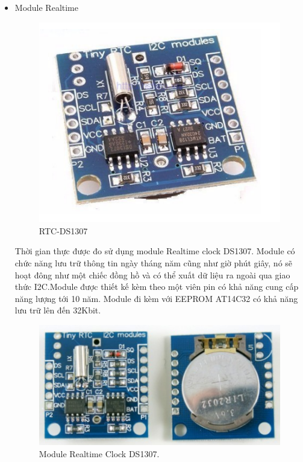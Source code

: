 \documentclass[a4paper,12pt,oneside]{article}
\begin{document}
\begin{itemize}
\begin{center}
\begin{figure}[htp]
\end{figure}
\end{center}


\item Module Realtime

\begin{center}
\begin{figure}[h!]
\begin{center}
\includegraphics[scale=.6]{hinh/rtc.png}
\end{center}
\caption{RTC-DS1307}

\end{figure}
\end{center}
Thời gian thực được đo sử dụng module Realtime clock DS1307. Module có chức năng lưu trữ thông tin ngày tháng năm cũng như giờ phút giây, nó sẽ hoạt đông như một chiếc đồng hồ và có thể xuất dữ liệu ra ngoài qua giao thức I2C.Module được thiết kế kèm theo một viên pin có khả năng cung cấp năng lượng tới 10 năm. Module đi kèm với EEPROM AT14C32 có khả năng lưu trữ lên đến 32Kbit.\\
\begin{center}
\begin{figure}[h!]
\begin{center}
\includegraphics[scale=.4]{hinh/DS1307.PNG}
\end{center}
\caption{Module Realtime Clock DS1307.}
\end{figure}
\end{center}


\end{itemize}
\end{document}
